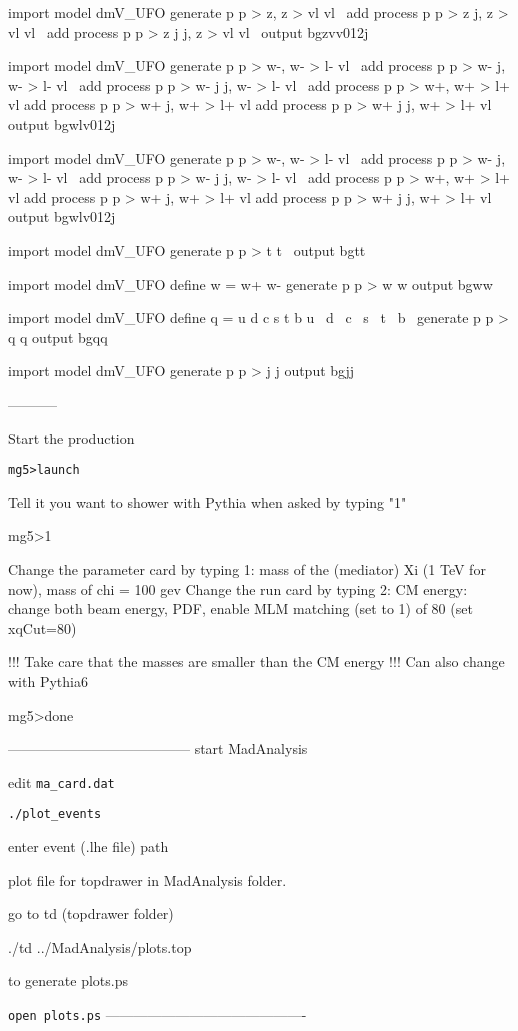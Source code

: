 import model dmV_UFO
generate p p > z, z > vl vl~
add process p p > z j, z > vl vl~
add process p p > z j j, z > vl vl~
output bgzvv012j

import model dmV_UFO
generate p p > w-, w- > l- vl~
add process p p > w- j, w- > l- vl~
add process p p > w- j j, w- > l- vl~
add process p p > w+, w+ > l+ vl
add process p p > w+ j, w+ > l+ vl
add process p p > w+ j j, w+ > l+ vl
output bgwlv012j

import model dmV_UFO
generate p p > w-, w- > l- vl~
add process p p > w- j, w- > l- vl~
add process p p > w- j j, w- > l- vl~
add process p p > w+, w+ > l+ vl
add process p p > w+ j, w+ > l+ vl
add process p p > w+ j j, w+ > l+ vl
output bgwlv012j


import model dmV_UFO
generate p p > t t~ 
output bgtt



import model dmV_UFO
define w = w+ w-
generate p p > w w
output bgww

import model dmV_UFO
define q = u d c s t b u~ d~ c~ s~ t~ b~
generate p p > q q
output bgqq

import model dmV_UFO
generate p p > j j 
output bgjj

-----------


Start the production

\lstinline|mg5>launch|

Tell it you want to shower with Pythia when asked by typing "1"

mg5>1

Change the parameter card by typing 1: mass of the (mediator) Xi (1 TeV for now), mass of chi = 100 gev
Change the run card by typing 2: CM energy: change both beam energy, PDF, enable MLM matching (set to 1) of 80 (set xqCut=80)

!!! Take care that the masses are smaller than the CM energy !!!
Can also change with Pythia6

mg5>done



---------------------------------------
start MadAnalysis

edit \lstinline|ma_card.dat|

\lstinline|./plot_events|

enter event (.lhe file) path

plot file for topdrawer in MadAnalysis folder.

go to td (topdrawer folder)

./td ../MadAnalysis/plots.top

to generate plots.ps

\lstinline|open plots.ps|
-------------------------------------------





